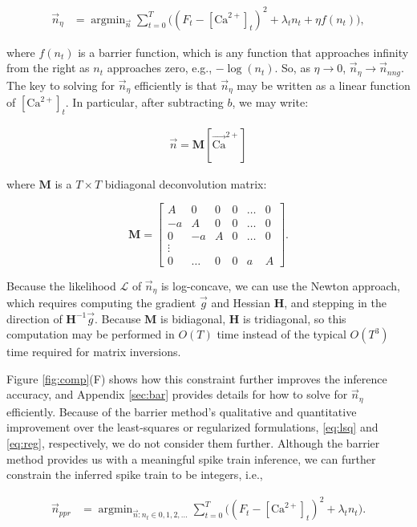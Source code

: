 \documentclass[12pt]{article}
\providecommand{\ve}[1]{\vec{#1}}
\providecommand{\ma}[1]{\boldsymbol{#1}}
\providecommand{\ve}[1]{\boldsymbol{#1}}
\DeclareMathOperator*{\argmin}{argmin}
\newcommand{\Lik}{\mathcal{L}}
\newcommand{\Ca}{[\text{Ca}^{2+}]}
\newcommand{\Cav}{[\ve{\text{Ca}}^{2+}]}
\begin{document}
\begin{align} \label{eq:b}
\ve{n}_{\eta} &= \argmin_{\ve{n}} \sum_{t=0}^T \big((F_t - \Ca_t)^2  + \lambda_t n_t + \eta f(n_t)\big),
\end{align}

\noindent where $f(n_t)$ is a barrier function, which is any function that approaches infinity from the right as $n_t$ approaches zero, e.g., $-\log(n_t)$.  So, as $\eta \rightarrow 0$, $\ve{n}_{\eta} \rightarrow \ve{n}_{nng}$. The key to solving for $\ve{n}_{\eta}$ efficiently is that $\ve{n}_{\eta}$ may be written as a linear function of $\Ca_t$.  In particular, after subtracting $b$, we may write:

\begin{align} \label{eq:nMC}
\ve{n}=\ma{M}\Cav
\end{align}

\noindent where $\ma{M}$ is a $T \times T$ bidiagonal deconvolution matrix:

\begin{equation} \label{eq:M}
\ma{M}=\begin{bmatrix}
A&0&0&0&\ldots&0\\
-a&A&0&0&\ldots&0\\
0&-a&A&0&\ldots&0\\
\vdots\\
0&\ldots&0&0&a&A
\end{bmatrix}.
\end{equation}

Because the likelihood $\Lik$ of $\ve{n}_{\eta}$ is log-concave, we can use the Newton approach, which requires computing the gradient $\ve{g}$ and Hessian $\ma{H}$, and stepping in the direction of $\ma{H}^{-1}\ve{g}$.  Because $\ma{M}$ is bidiagonal, $\ma{H}$ is tridiagonal, so this computation may be performed in $O(T)$ time instead of the typical $O(T^3)$ time required for matrix inversions. 
 
Figure \ref{fig:comp}(F) shows how this constraint further improves the inference accuracy, and Appendix \ref{sec:bar} provides details for how to solve for $\ve{n}_{\eta}$ efficiently. Because of the barrier method's qualitative and quantitative improvement over the least-squares or regularized formulations, \eqref{eq:lsq} and \eqref{eq:reg}, respectively, we do not consider them further.  Although the barrier method provides us with a meaningful spike train inference, we can further constrain the inferred spike train to be integers, i.e.,

\begin{align} \label{eq:ppr}
\ve{n}_{ppr} &= \argmin_{\ve{n}: n_t \in 0,1,2,\ldots} \sum_{t=0}^T \big((F_t - \Ca_t)^2  + \lambda_t n_t\big).
\end{align}
\end{document}
